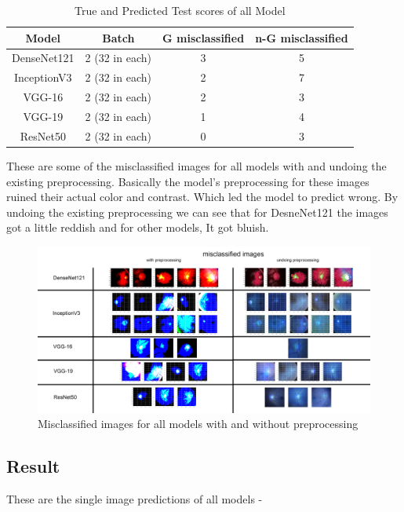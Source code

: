 \documentclass[conference]{IEEEtran}
\begin{document}
\begin{table}[hbt!]
\begin{tabular}{|c | c | c| c |}
\hline
\textbf{Model} & \textbf{Batch} & \textbf{G misclassified} & \textbf{n-G misclassified}}\\
\hline
DenseNet121 & 2 (32 in each) & 3 &  5\\
\hline
InceptionV3 & 2 (32 in each) & 2 & 7\\
\hline
VGG-16 & 2 (32 in each) & 2 & 3\\
\hline
VGG-19 & 2 (32 in each) & 1 & 4\\
\hline
ResNet50 & 2 (32 in each) & 0 & 3\\
\hline

\end{tabular}
\caption{True and Predicted Test scores of all Model}
\label{tab:True and Predicted Test scores of all Model}
\end{table}

\vspace{5mm}
\noindent These are some of the misclassified images for all models with and undoing the existing preprocessing. Basically the model’s preprocessing for these images ruined their actual color and contrast.  Which led the model to predict wrong. By undoing the existing preprocessing we can see that for DesneNet121 the images got a little reddish and for other models, It got bluish.

\begin{figure}[hbt!]
\centering
\includegraphics[scale=0.25]{fig-41.png}
\caption{Misclassified images for all models with and without preprocessing}
\label{fig:x True and Predicted Train scores of ResNet50}
\end{figure}

\subsection{Result}
These are the single image predictions of all models - 
\end{document}
